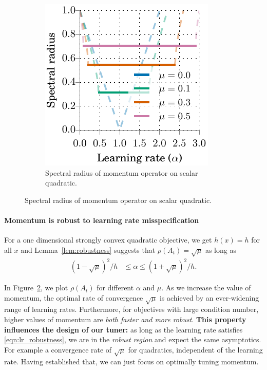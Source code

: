 \documentclass{article}
\newcommand{\mat}[1]{\bm{\mathit{#1}}}
\begin{document}
\begin{figure}
\vspace{-2.5em}
\begin{minipage}{1.0\linewidth}
\begin{figure}[H]
  \includegraphics[width=1.0\linewidth]{figures/spectral_radii}
\caption{
Spectral radius of momentum operator on scalar quadratic.
}
\label{fig:lr_robustness}
\end{figure}
\end{minipage}
\end{figure}
\paragraph{Momentum is robust to learning rate misspecification}
\label{sec:lr_robustness}
For a one dimensional strongly convex quadratic objective,
we get $h(x)=h$ for all $x$ and Lemma~\ref{lem:robustness} suggests that $\rho(\mat{A}_t)=\sqrt{\mu}$ as long as
\begin{align}
{(1-\sqrt{\mu})^2/h} &\leq \alpha \leq {(1+\sqrt{\mu})^2/h}.
\label{eqn:lr_robustness}
\end{align}

In Figure~\ref{fig:lr_robustness}, we plot $\rho(\mat{A}_t)$ for different $\alpha$ and $\mu$.
As we increase the value of momentum, the optimal rate of convergence $\sqrt{\mu}$ is achieved by an ever-widening range of learning rates. 
Furthermore, for objectives with large condition number, higher values of momentum are {\em both faster and more robust}.
{\bf This property influences the design of our tuner:} as long as the learning rate satisfies \eqref{eqn:lr_robustness}, we are in the {\em robust region} and 
expect the same asymptotics. For example a convergence rate of $\sqrt{\mu}$ for quadratics, independent of the learning rate.
Having established that, we can just focus on optimally tuning momentum.
\end{document}
